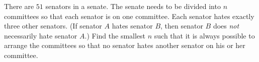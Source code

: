 There are $51$ senators in a senate. The senate needs to be divided into $n$ committees so that each senator is on one committee. Each senator hates exactly three other senators. (If senator $A$ hates senator $B$, then senator $B$ does \emph{not} necessarily hate senator $A$.) Find the smallest $n$ such that it is always possible to arrange the committees so that no senator hates another senator on his or her committee.